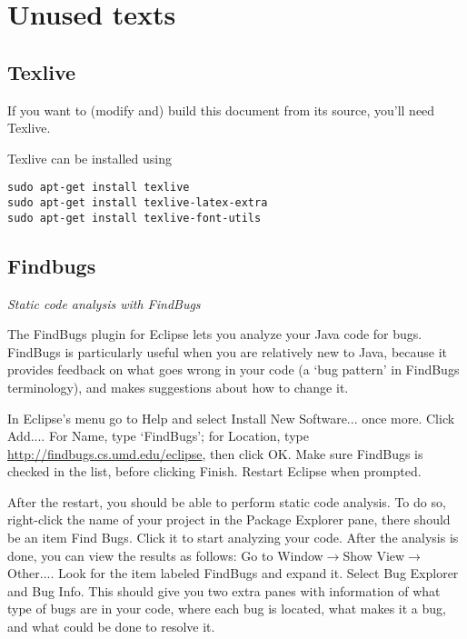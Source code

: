 \chapter{Unused texts}





\section{Texlive}

If you want to (modify and) build this document from its \tex source, you'll need Texlive.

Texlive can be installed using
\begin{lstlisting}[style=basic,style=bash]
sudo apt-get install texlive
sudo apt-get install texlive-latex-extra
sudo apt-get install texlive-font-utils
\end{lstlisting}








\section{Findbugs}

\vspace{2em}
\textit{Static code analysis with FindBugs}

The FindBugs plugin for Eclipse lets you analyze your Java code for bugs. FindBugs is particularly useful when you are relatively new to Java, because it provides feedback on what goes wrong in your code (a `bug pattern' in FindBugs terminology), and makes suggestions about how to change it.

In Eclipse's menu go to \textsf{Help} and select \textsf{Install New Software...} once more. Click \textsf{Add...}. For \textsf{Name}, type `FindBugs'; for \textsf{Location}, type \url{ http://findbugs.cs.umd.edu/eclipse}, then click \textsf{OK}. Make sure \textsf{FindBugs} is checked in the list, before clicking \textsf{Finish}. Restart Eclipse when prompted.

After the restart, you should be able to perform static code analysis. To do so, right-click the name of your project in the \textsf{Package Explorer} pane, there should be an item \textsf{Find Bugs}. Click it to start analyzing your code. After the analysis is done, you can view the results as follows: Go to \textsf{Window}$\rightarrow$\textsf{Show View}$\rightarrow$\textsf{Other...}. Look for the item labeled \textsf{FindBugs} and expand it. Select \textsf{Bug Explorer} and \textsf{Bug Info}. This should give you two extra panes with information of what type of bugs are in your code, where each bug is located, what makes it a bug, and what could be done to resolve it.










